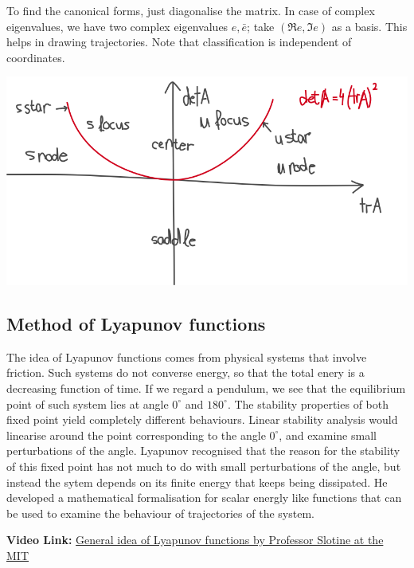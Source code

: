\documentclass[hidelinks,a4paper, 11pt]{article}
\theoremstyle{plain}
\theoremstyle{break}
\theoremstyle{plain}
\theoremstyle{definition}
\begin{document}
To find the canonical forms, just diagonalise the matrix. In case of complex eigenvalues, we have two complex eigenvalues $e, \bar e$; take $(\Re e, \Im e)$ as a basis. This helps in drawing trajectories. Note that classification is independent of coordinates.

\includegraphics[scale=0.5]{graphic-nodes}
 
\subsection{Method of Lyapunov functions}


The idea of Lyapunov functions comes from physical systems that involve friction. Such systems do not converse energy, so that the total enery is a decreasing function of time. If we regard a pendulum, we see that the equilibrium point of such system lies at angle $0^\circ$ and $180^\circ$. The stability properties of both fixed point yield completely different behaviours. Linear stability analysis would linearise around the point corresponding to the angle $0^\circ$, and examine small perturbations of the angle. Lyapunov recognised that the reason for the stability of this fixed point has not much to do with small perturbations of the angle, but instead the sytem depends on its finite energy that keeps being dissipated. He developed a mathematical formalisation for scalar energly like functions that can be used to examine the behaviour of trajectories of the system.

\begin{framed}
	\textbf{Video Link:} \href{https://www.youtube.com/watch?v=jBAlzA0gYGk&feature=youtu.be}{General idea of Lyapunov functions by Professor Slotine at the MIT}
\end{framed}
\end{document}

